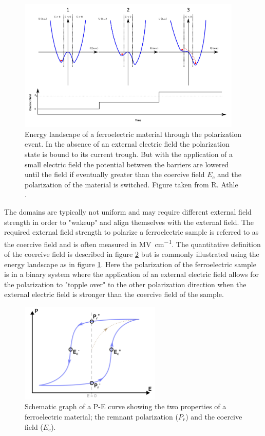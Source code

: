 \documentclass[11pt,twoside,final]{eitExjobb}  %
\begin{document}
\begin{figure}[htbp]
    \centering
    \includegraphics[width=0.95\textwidth]{fig/img/coercivefield.png}
    \caption{Energy landscape of a ferroelectric material through the
    polarization event. In the absence of an external electric field the
    polarization state is bound to its current trough. But with the application
    of a small electric field the potential between the barriers are lowered until
    the field if eventually greater than the coercive field $E_c$ and the
    polarization of the material is switched. Figure taken from R. Athle
    \cite{athle2019development}.}
    \label{fig:theo_Ec}
\end{figure}

The domains are typically not uniform and may require different external field
strength in order to "wakeup" and align themselves with the external field. The
required external field strength to polarize a ferroelectric sample is referred
to as the coercive field and is often measured in
\si{\mega\volt\per\centi\meter}. The quantitative definition of the coercive
field is described in figure \ref{fig:theo_PE} but is commonly illustrated
using the energy landscape as in figure \ref{fig:theo_Ec}. Here the
polarization of the ferroelectric sample is in a binary system where the
application of an external electric field allows for the polarization to
"topple over" to the other polarization direction when the external electric
field is stronger than the coercive field of the sample.

\begin{figure}[htbp]
    \centering
    \includegraphics[width=0.60\textwidth]{fig/img/PE.png}
    \caption{Schematic graph of a P-E curve showing the two properties of a
        ferroelectric material; the remnant polarization ($P_r$) and the
        coercive field ($E_c$).}
    \label{fig:theo_PE}
\end{figure}
\end{document}
